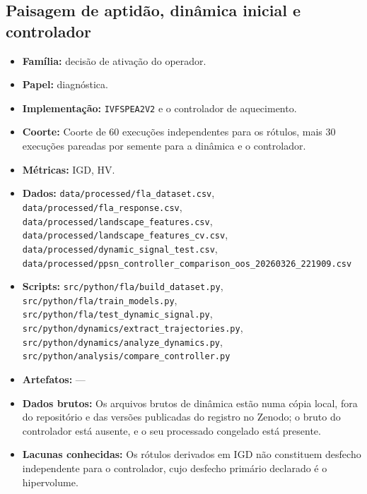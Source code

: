 \subsection*{Paisagem de aptidão, dinâmica inicial e controlador}
\begin{itemize}[nosep]\raggedright
    \item \textbf{Família:} decisão de ativação do operador.
    \item \textbf{Papel:} diagnóstica.
    \item \textbf{Implementação:} \texttt{IVFSPEA2V2} e o controlador de aquecimento.
    \item \textbf{Coorte:} Coorte de 60 execuções independentes para os rótulos, mais 30 execuções pareadas por semente para a dinâmica e o controlador.
    \item \textbf{Métricas:} IGD, HV.
    \item \textbf{Dados:} \texttt{data/\allowbreak{}processed/\allowbreak{}fla\_\allowbreak{}dataset.csv}, \texttt{data/\allowbreak{}processed/\allowbreak{}fla\_\allowbreak{}response.csv}, \texttt{data/\allowbreak{}processed/\allowbreak{}landscape\_\allowbreak{}features.csv}, \texttt{data/\allowbreak{}processed/\allowbreak{}landscape\_\allowbreak{}features\_\allowbreak{}cv.csv}, \texttt{data/\allowbreak{}processed/\allowbreak{}dynamic\_\allowbreak{}signal\_\allowbreak{}test.csv}, \texttt{data/\allowbreak{}processed/\allowbreak{}ppsn\_\allowbreak{}controller\_\allowbreak{}comparison\_\allowbreak{}oos\_\allowbreak{}20260326\_\allowbreak{}221909.csv}
    \item \textbf{Scripts:} \texttt{src/\allowbreak{}python/\allowbreak{}fla/\allowbreak{}build\_\allowbreak{}dataset.py}, \texttt{src/\allowbreak{}python/\allowbreak{}fla/\allowbreak{}train\_\allowbreak{}models.py}, \texttt{src/\allowbreak{}python/\allowbreak{}fla/\allowbreak{}test\_\allowbreak{}dynamic\_\allowbreak{}signal.py}, \texttt{src/\allowbreak{}python/\allowbreak{}dynamics/\allowbreak{}extract\_\allowbreak{}trajectories.py}, \texttt{src/\allowbreak{}python/\allowbreak{}dynamics/\allowbreak{}analyze\_\allowbreak{}dynamics.py}, \texttt{src/\allowbreak{}python/\allowbreak{}analysis/\allowbreak{}compare\_\allowbreak{}controller.py}
    \item \textbf{Artefatos:} ---
    \item \textbf{Dados brutos:} Os arquivos brutos de dinâmica estão numa cópia local, fora do repositório e das versões publicadas do registro no Zenodo; o bruto do controlador está ausente, e o seu processado congelado está presente.
    \item \textbf{Lacunas conhecidas:} Os rótulos derivados em IGD não constituem desfecho independente para o controlador, cujo desfecho primário declarado é o hipervolume.
\end{itemize}


